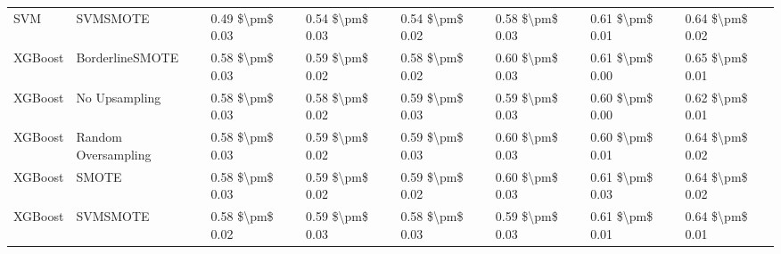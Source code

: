 \begin{tabular}{llllllll}
                            SVM &                      SVMSMOTE & 0.49 \$\textbackslash pm\$ 0.03 &           0.54 \$\textbackslash pm\$ 0.03 &       0.54 \$\textbackslash pm\$ 0.02 &        0.58 \$\textbackslash pm\$ 0.03 &                         0.61 \$\textbackslash pm\$ 0.01 &     0.64 \$\textbackslash pm\$ 0.02 \\
                        XGBoost &               BorderlineSMOTE & 0.58 \$\textbackslash pm\$ 0.03 &           0.59 \$\textbackslash pm\$ 0.02 &       0.58 \$\textbackslash pm\$ 0.02 &        0.60 \$\textbackslash pm\$ 0.03 &                         0.61 \$\textbackslash pm\$ 0.00 &     0.65 \$\textbackslash pm\$ 0.01 \\
                        XGBoost &                 No Upsampling & 0.58 \$\textbackslash pm\$ 0.03 &           0.58 \$\textbackslash pm\$ 0.02 &       0.59 \$\textbackslash pm\$ 0.03 &        0.59 \$\textbackslash pm\$ 0.03 &                         0.60 \$\textbackslash pm\$ 0.00 &     0.62 \$\textbackslash pm\$ 0.01 \\
                        XGBoost &           Random Oversampling & 0.58 \$\textbackslash pm\$ 0.03 &           0.59 \$\textbackslash pm\$ 0.02 &       0.59 \$\textbackslash pm\$ 0.03 &        0.60 \$\textbackslash pm\$ 0.03 &                         0.60 \$\textbackslash pm\$ 0.01 &     0.64 \$\textbackslash pm\$ 0.02 \\
                        XGBoost &                         SMOTE & 0.58 \$\textbackslash pm\$ 0.03 &           0.59 \$\textbackslash pm\$ 0.02 &       0.59 \$\textbackslash pm\$ 0.02 &        0.60 \$\textbackslash pm\$ 0.03 &                         0.61 \$\textbackslash pm\$ 0.03 &     0.64 \$\textbackslash pm\$ 0.02 \\
                        XGBoost &                      SVMSMOTE & 0.58 \$\textbackslash pm\$ 0.02 &           0.59 \$\textbackslash pm\$ 0.03 &       0.58 \$\textbackslash pm\$ 0.03 &        0.59 \$\textbackslash pm\$ 0.03 &                         0.61 \$\textbackslash pm\$ 0.01 &     0.64 \$\textbackslash pm\$ 0.01 \\
\bottomrule
\end{tabular}
